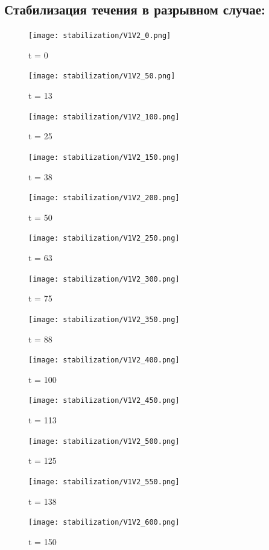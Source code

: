 \documentclass[a4paper,11pt]{article}
\begin{document}
\subsection{Стабилизация течения в разрывном случае:}
\begin{figure}[H]
\centering
\texttt{[image: stabilization/V1V2\_0.png]}
\caption{t = 0}
\end{figure}
\begin{figure}[H]
\centering
\texttt{[image: stabilization/V1V2\_50.png]}
\caption{t = 13}
\end{figure}
\begin{figure}[H]
\centering
\texttt{[image: stabilization/V1V2\_100.png]}
\caption{t = 25}
\end{figure}
\begin{figure}[H]
\centering
\texttt{[image: stabilization/V1V2\_150.png]}
\caption{t = 38}
\end{figure}
\begin{figure}[H]
\centering
\texttt{[image: stabilization/V1V2\_200.png]}
\caption{t = 50}
\end{figure}
\begin{figure}[H]
\centering
\texttt{[image: stabilization/V1V2\_250.png]}
\caption{t = 63}
\end{figure}
\begin{figure}[H]
\centering
\texttt{[image: stabilization/V1V2\_300.png]}
\caption{t = 75}
\end{figure}
\begin{figure}[H]
\centering
\texttt{[image: stabilization/V1V2\_350.png]}
\caption{t = 88}
\end{figure}
\begin{figure}[H]
\centering
\texttt{[image: stabilization/V1V2\_400.png]}
\caption{t = 100}
\end{figure}
\begin{figure}[H]
\centering
\texttt{[image: stabilization/V1V2\_450.png]}
\caption{t = 113}
\end{figure}
\begin{figure}[H]
\centering
\texttt{[image: stabilization/V1V2\_500.png]}
\caption{t = 125}
\end{figure}
\begin{figure}[H]
\centering
\texttt{[image: stabilization/V1V2\_550.png]}
\caption{t = 138}
\end{figure}
\begin{figure}[H]
\centering
\texttt{[image: stabilization/V1V2\_600.png]}
\caption{t = 150}
\end{figure}
\end{document}
